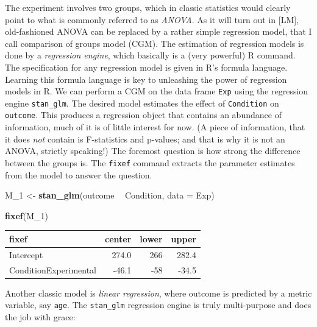 \documentclass[]{svmono}
\newenvironment{Shaded}{\begin{snugshade}}{\end{snugshade}}
\newcommand{\KeywordTok}[1]{\textcolor[rgb]{0.13,0.29,0.53}{\textbf{#1}}}
\newcommand{\DataTypeTok}[1]{\textcolor[rgb]{0.13,0.29,0.53}{#1}}
\newcommand{\DecValTok}[1]{\textcolor[rgb]{0.00,0.00,0.81}{#1}}
\newcommand{\StringTok}[1]{\textcolor[rgb]{0.31,0.60,0.02}{#1}}
\newcommand{\OperatorTok}[1]{\textcolor[rgb]{0.81,0.36,0.00}{\textbf{#1}}}
\newcommand{\NormalTok}[1]{#1}
\begin{document}
The experiment involves two groups, which in classic statistics would
clearly point to what is commonly referred to as \emph{ANOVA}. As it
will turn out in {[}LM{]}, old-fashioned ANOVA can be replaced by a
rather simple regression model, that I call comparison of groups model
(CGM). The estimation of regression models is done by a \emph{regression
engine}, which basically is a (very powerful) R command. The
specification for any regression model is given in R's formula language.
Learning this formula language is key to unleashing the power of
regression models in R. We can perform a CGM on the data frame
\texttt{Exp} using the regression engine \texttt{stan\_glm}. The desired
model estimates the effect of \texttt{Condition} on \texttt{outcome}.
This produces a regression object that contains an abundance of
information, much of it is of little interest for now. (A piece of
information, that it does \emph{not} contain is F-statistics and
p-values; and that is why it is not an ANOVA, strictly speaking!) The
foremost question is how strong the difference between the groups is.
The \texttt{fixef} command extracts the parameter estimates from the
model to answer the question.

\begin{Shaded}
\begin{Highlighting}[]
\NormalTok{M_}\DecValTok{1}\NormalTok{ <-}\StringTok{ }
\StringTok{  }\KeywordTok{stan_glm}\NormalTok{(outcome }\OperatorTok{~}\StringTok{ }\NormalTok{Condition, }
     \DataTypeTok{data =}\NormalTok{ Exp)}
\end{Highlighting}
\end{Shaded}

\begin{Shaded}
\begin{Highlighting}[]
\KeywordTok{fixef}\NormalTok{(M_}\DecValTok{1}\NormalTok{)}
\end{Highlighting}
\end{Shaded}

\begin{longtable}[]{@{}lrrr@{}}
\toprule
fixef & center & lower & upper\tabularnewline
\midrule
\endhead
Intercept & 274.0 & 266 & 282.4\tabularnewline
ConditionExperimental & -46.1 & -58 & -34.5\tabularnewline
\bottomrule
\end{longtable}

Another classic model is \emph{linear regression}, where outcome is
predicted by a metric variable, say \texttt{age}. The \texttt{stan\_glm}
regression engine is truly multi-purpose and does the job with grace:
\end{document}
